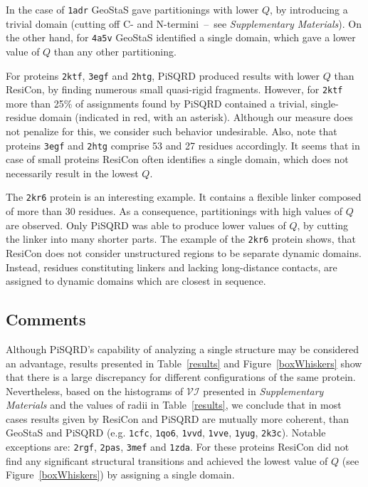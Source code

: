 In the case of \texttt{1adr} GeoStaS gave partitionings with lower $Q$, by introducing a trivial domain (cutting off C- and N-termini~--~see \emph{Supplementary Materials}).
On the other hand, for \texttt{4a5v} GeoStaS identified a single domain, which gave a lower value of $Q$ than any other partitioning.

For proteins \texttt{2ktf}, \texttt{3egf} and \texttt{2htg}, PiSQRD produced results with lower $Q$ than ResiCon, by finding numerous small quasi-rigid fragments.
However, for \texttt{2ktf} more than 25\% of assignments found by PiSQRD contained a trivial, single-residue domain (indicated in red, with an asterisk).
Although our measure does not penalize for this, we consider such behavior undesirable.
Also, note that proteins \texttt{3egf} and \texttt{2htg} comprise 53 and 27 residues accordingly.
It seems that in case of small proteins ResiCon often identifies a single domain, which does not necessarily result in the lowest $Q$.

The \texttt{2kr6} protein is an interesting example. 
It contains a flexible linker composed of more than 30 residues.
As a consequence, partitionings with high values of $Q$ are observed.
Only PiSQRD was able to produce lower values of $Q$, by cutting the linker into many shorter parts.
The example of the \texttt{2kr6} protein shows, that ResiCon does not consider unstructured regions to be separate dynamic domains.
Instead, residues constituting linkers and lacking long-distance contacts, are assigned to dynamic domains which are closest in sequence.

\subsection*{Comments}
Although PiSQRD's capability of analyzing a single structure may be considered an advantage, results presented in Table~\ref{results} and Figure~\ref{boxWhiskers} show that there is a large discrepancy for different configurations of the same protein.
Nevertheless, based on the histograms of $\mathcal{VI}$ presented in \emph{Supplementary Materials} and the values of radii in Table~\ref{results}, we conclude that in most cases results given by ResiCon and PiSQRD are mutually more coherent, than GeoStaS and PiSQRD (e.g. \texttt{1cfc}, \texttt{1qo6}, \texttt{1vvd}, \texttt{1vve}, \texttt{1yug}, \texttt{2k3c}).
Notable exceptions are: \texttt{2rgf}, \texttt{2pas}, \texttt{3mef} and \texttt{1zda}. 
For these proteins ResiCon did not find any significant structural transitions and achieved the lowest value of $Q$ (see Figure~\ref{boxWhiskers}) by assigning a single domain.

